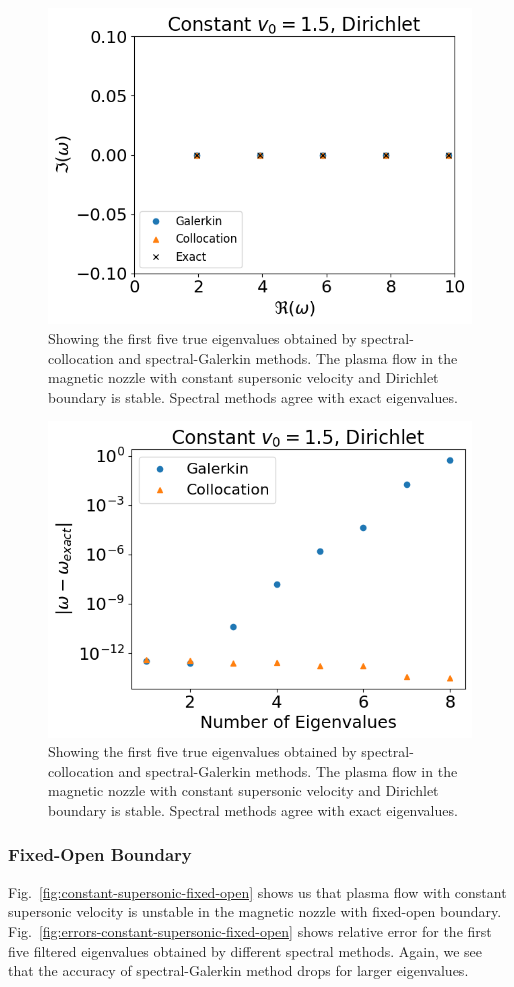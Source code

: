 \begin{figure}[htbp]
	\centering
	\includegraphics[width=0.7\linewidth]{figures/constant-supersonic-dirichlet.png}
	\caption{Showing the first five true eigenvalues obtained by spectral-collocation and spectral-Galerkin methods. The plasma flow in the magnetic nozzle with constant supersonic velocity and Dirichlet boundary is stable. Spectral methods agree with exact eigenvalues.}
	\label{fig:constant-supersonic-dirichlet}
\end{figure}

\begin{figure}[htbp]
	\centering
	\includegraphics[width=0.7\linewidth]{figures/errors-constant-supersonic-dirichlet.png}
	\caption{Showing the first five true eigenvalues obtained by spectral-collocation and spectral-Galerkin methods. The plasma flow in the magnetic nozzle with constant supersonic velocity and Dirichlet boundary is stable. Spectral methods agree with exact eigenvalues.}
	\label{fig:errors-constant-supersonic-dirichlet}
\end{figure}

\subsubsection*{Fixed-Open Boundary}
Fig.~\ref{fig:constant-supersonic-fixed-open} shows us that plasma flow with constant supersonic velocity is unstable in the magnetic nozzle with fixed-open boundary. Fig.~\ref{fig:errors-constant-supersonic-fixed-open} shows relative error for the first five filtered eigenvalues obtained by different spectral methods. Again, we see that the accuracy of spectral-Galerkin method drops for larger eigenvalues.

